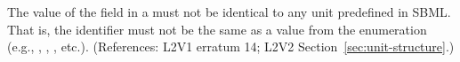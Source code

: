 The value of the  field in a \UnitDefinition must not be
identical to any unit predefined in SBML.  That is, the identifier must not
be the same as a value from the  enumeration (e.g.,
, , , etc.).  (References: L2V1
erratum 14; L2V2 Section~\ref{sec:unit-structure}.)
